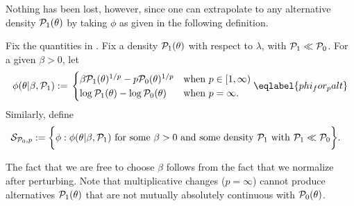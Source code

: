 Nothing has been lost, however, since one can extrapolate to any alternative
density $\mathcal{P}_{1}(\theta)$ by taking $\phi$ as given in the following definition.


\begin{defn}
%
Fix the quantities in .  Fix a density $\mathcal{P}_{1}(\theta)$
with respect to $\lambda$, with $\mathcal{P}_{1} \ll \mathcal{P}_{0}$. For a given $\beta > 0$, let
%
\begin{align}
%
\phi(\theta | \beta, \palt) :={}
\begin{cases}
\beta \palt(\theta)^{1/p} - p \pbase(\theta)^{1/p}
    & \textrm{when }p \in [1, \infty) \\
\log \palt(\theta) - \log \pbase(\theta)
    & \textrm{when }p = \infty.
\end{cases} \eqlabel{phi_for_palt}
%
\end{align}
%
Similarly, define
%
\begin{align*}
%
\pertset := \bigg\{&
    \phi:  \phi(\theta | \beta, \palt) %
    \textrm{ for some }\beta > 0\textrm{ and some density }\palt
    \textrm{ with } \palt \ll \pbase
\bigg\}.
%
\end{align*}
%
%
\end{defn}

The fact that we are free to choose $\beta$ follows from the fact that we
normalize after perturbing.  Note that multiplicative changes ($p=\infty$)
cannot produce alternatives $\mathcal{P}_{1}(\theta)$ that are not mutually absolutely
continuous with $\mathcal{P}_{0}(\theta)$.


